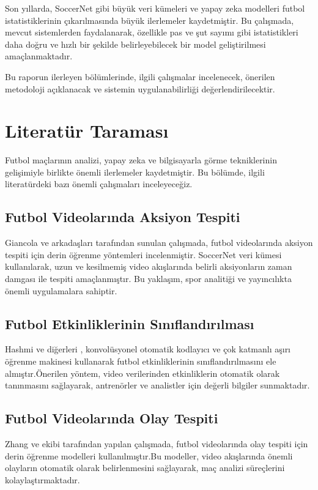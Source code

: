 \documentclass[a4paper,12pt]{article}
\begin{document}
	Son yıllarda, SoccerNet gibi büyük veri kümeleri ve yapay zeka modelleri futbol istatistiklerinin çıkarılmasında büyük ilerlemeler kaydetmiştir. Bu çalışmada, mevcut sistemlerden faydalanarak, özellikle pas ve şut sayımı gibi istatistikleri daha doğru ve hızlı bir şekilde belirleyebilecek bir model geliştirilmesi amaçlanmaktadır.
	
	Bu raporun ilerleyen bölümlerinde, ilgili çalışmalar incelenecek, önerilen metodoloji açıklanacak ve sistemin uygulanabilirliği değerlendirilecektir.
	
	\section{Literatür Taraması}
	
	Futbol maçlarının analizi, yapay zeka ve bilgisayarla görme tekniklerinin gelişimiyle birlikte önemli ilerlemeler kaydetmiştir. Bu bölümde, ilgili literatürdeki bazı önemli çalışmaları inceleyeceğiz.
	
	\subsection{Futbol Videolarında Aksiyon Tespiti}
	
	Giancola ve arkadaşları  tarafından sunulan çalışmada, futbol videolarında aksiyon tespiti için derin öğrenme yöntemleri incelenmiştir\cite{giancola2024deep}. SoccerNet veri kümesi kullanılarak, uzun ve kesilmemiş video akışlarında belirli aksiyonların zaman damgası ile tespiti amaçlanmıştır. Bu yaklaşım, spor analitiği ve yayıncılıkta önemli uygulamalara sahiptir.
	
	\subsection{Futbol Etkinliklerinin Sınıflandırılması}
	
	Hashmi ve diğerleri , konvolüsyonel otomatik kodlayıcı ve çok katmanlı aşırı öğrenme makinesi kullanarak futbol etkinliklerinin sınıflandırılmasını ele almıştır\cite{kumar2022football}.Önerilen yöntem, video verilerinden etkinliklerin otomatik olarak tanınmasını sağlayarak, antrenörler ve analistler için değerli bilgiler sunmaktadır.
	
	\subsection{Futbol Videolarında Olay Tespiti}
	
	Zhang ve ekibi tarafından yapılan çalışmada, futbol videolarında olay tespiti için derin öğrenme modelleri kullanılmıştır\cite{zhang2022event}.Bu modeller, video akışlarında önemli olayların otomatik olarak belirlenmesini sağlayarak, maç analizi süreçlerini kolaylaştırmaktadır.
	
\end{document}
